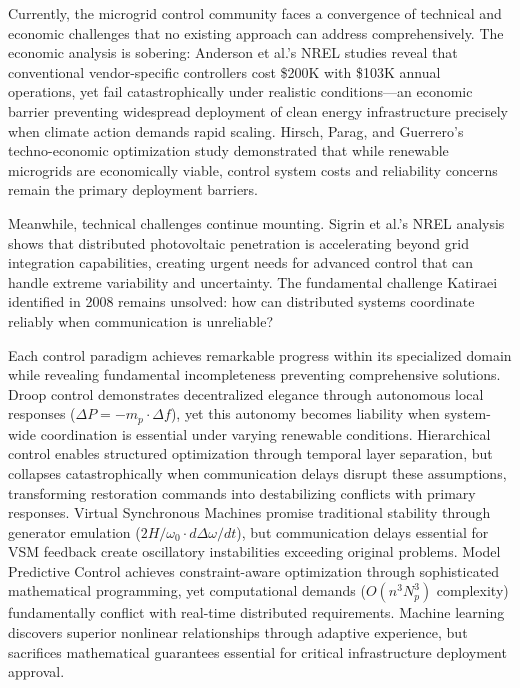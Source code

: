\documentclass[12pt]{article}
\begin{document}
Currently, the microgrid control community faces a convergence of technical and economic challenges that no existing approach can address comprehensively. The economic analysis is sobering: Anderson et al.'s NREL studies \cite{anderson2021,anderson2019} reveal that conventional vendor-specific controllers cost \$200K with \$103K annual operations, yet fail catastrophically under realistic conditions—an economic barrier preventing widespread deployment of clean energy infrastructure precisely when climate action demands rapid scaling. Hirsch, Parag, and Guerrero's techno-economic optimization study \cite{hirsch2018} demonstrated that while renewable microgrids are economically viable, control system costs and reliability concerns remain the primary deployment barriers.

Meanwhile, technical challenges continue mounting. Sigrin et al.'s NREL analysis \cite{sigrin2019} shows that distributed photovoltaic penetration is accelerating beyond grid integration capabilities, creating urgent needs for advanced control that can handle extreme variability and uncertainty. The fundamental challenge Katiraei identified in 2008 remains unsolved: how can distributed systems coordinate reliably when communication is unreliable?



Each control paradigm achieves remarkable progress within its specialized domain while revealing fundamental incompleteness preventing comprehensive solutions. Droop control demonstrates decentralized elegance through autonomous local responses ($\Delta P = -m_p \cdot \Delta f$), yet this autonomy becomes liability when system-wide coordination is essential under varying renewable conditions. Hierarchical control enables structured optimization through temporal layer separation, but collapses catastrophically when communication delays disrupt these assumptions, transforming restoration commands into destabilizing conflicts with primary responses. Virtual Synchronous Machines promise traditional stability through generator emulation ($2H/\omega_0 \cdot d\Delta\omega/dt$), but communication delays essential for VSM feedback create oscillatory instabilities exceeding original problems. Model Predictive Control achieves constraint-aware optimization through sophisticated mathematical programming, yet computational demands ($O(n^3N_p^3)$ complexity) fundamentally conflict with real-time distributed requirements. Machine learning discovers superior nonlinear relationships through adaptive experience, but sacrifices mathematical guarantees essential for critical infrastructure deployment approval.
\end{document}
